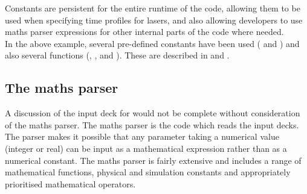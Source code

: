 Constants are persistent for the entire runtime of the code,
allowing them to be used when specifying time profiles for lasers, and also
allowing developers to use maths parser expressions for other internal parts of
the code where needed.\\

In the above example, several pre-defined constants have been used
( and ) and also several functions
(, ,  and
). These are described in  and
.

\subsection{The maths parser}
\label{sec:maths_parser}
A discussion of the input deck for {\EPOCH} would not be complete without
consideration of the maths parser. The maths parser is the code which reads
the input decks.
The parser makes it possible that any parameter taking a
numerical value (integer or real) can be input as a mathematical expression
rather than as a numerical constant. The maths parser is fairly extensive and
includes a range of mathematical functions, physical and simulation constants
and appropriately prioritised mathematical operators.


